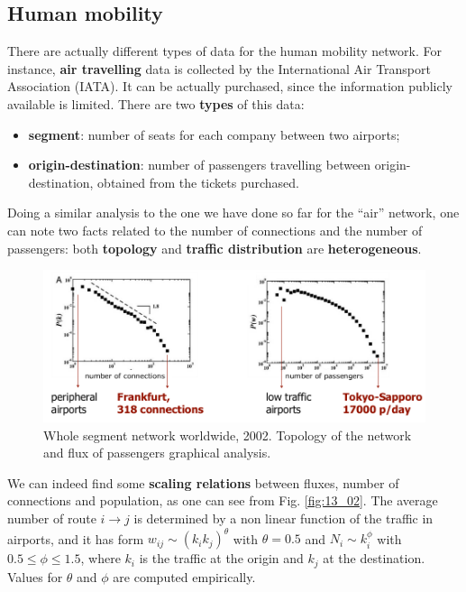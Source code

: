 \documentclass[../main/main.tex]{subfiles}
\begin{document}
\subsection{Human mobility}
\label{section:human_mobility}

There are actually different types of data for the human mobility network. For instance, \textbf{air travelling} data is collected by the International Air Transport Association (IATA). It can be actually purchased, since the information publicly available is limited. There are two \textbf{types} of this data:
 \begin{itemize}
     \item \textbf{segment}: number of seats for each company between two airports;
     \item \textbf{origin-destination}: number of passengers travelling between origin-destination, obtained from the tickets purchased.
 \end{itemize}
Doing a similar analysis to the one we have done so far for the “air” network, one can note two facts related to the number of connections and the number of passengers: both \textbf{topology} and \textbf{traffic distribution} are \textbf{heterogeneous}.

\begin{figure}[h!]
\centering
\includegraphics[width=1.0\textwidth]{../lessons/image/14/image01.png}
\caption{\label{fig:13_01} Whole segment network worldwide, 2002. Topology of the network and flux of passengers graphical analysis.}
\end{figure}

We can indeed find some \textbf{scaling relations} between fluxes, number of connections and population, as one can see from Fig. \ref{fig:13_02}. The average number of route $i \to j$ is determined by a non linear function of the traffic in airports, and it has form $w_{ij} \sim (k_i k_j)^\theta$ with $\theta =0.5$ and $N_i \sim k_i^{\phi}$ with $ 0.5\le \phi\le 1.5$, where $k_i$ is the traffic at the origin and $k_j$ at the destination. Values for $\theta$ and $\phi$ are computed empirically.
\end{document}
